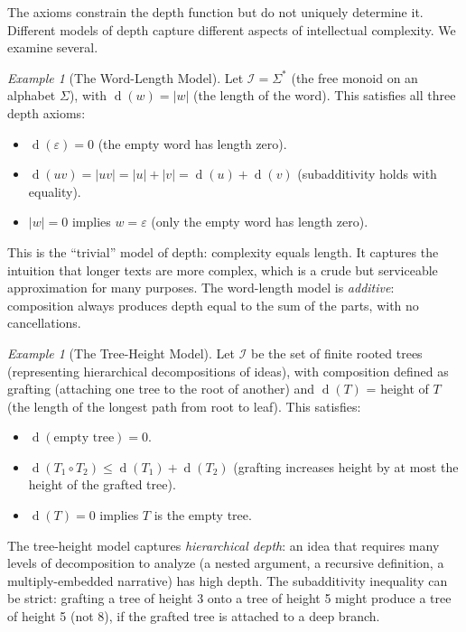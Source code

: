 \documentclass[11pt,openany]{book}
\theoremstyle{definition}
\theoremstyle{plain}
\theoremstyle{remark}
\newtheorem{example}[axiom]{Example}
\newcommand{\IS}{\mathcal{I}}               %
\newcommand{\depth}{\operatorname{d}}       %
\begin{document}
The axioms constrain the depth function but do not uniquely determine it. Different models of depth capture different aspects of intellectual complexity. We examine several.

\begin{example}[The Word-Length Model]
Let $\IS = \Sigma^*$ (the free monoid on an alphabet $\Sigma$), with $\depth(w) = |w|$ (the length of the word). This satisfies all three depth axioms:
\begin{itemize}
\item $\depth(\varepsilon) = 0$ (the empty word has length zero).
\item $\depth(uv) = |uv| = |u| + |v| = \depth(u) + \depth(v)$ (subadditivity holds with equality).
\item $|w| = 0$ implies $w = \varepsilon$ (only the empty word has length zero).
\end{itemize}
This is the ``trivial'' model of depth: complexity equals length. It captures the intuition that longer texts are more complex, which is a crude but serviceable approximation for many purposes. The word-length model is \emph{additive}: composition always produces depth equal to the sum of the parts, with no cancellations.
\end{example}

\begin{example}[The Tree-Height Model]
Let $\IS$ be the set of finite rooted trees (representing hierarchical decompositions of ideas), with composition defined as grafting (attaching one tree to the root of another) and $\depth(T)$ = height of $T$ (the length of the longest path from root to leaf). This satisfies:
\begin{itemize}
\item $\depth(\text{empty tree}) = 0$.
\item $\depth(T_1 \circ T_2) \leq \depth(T_1) + \depth(T_2)$ (grafting increases height by at most the height of the grafted tree).
\item $\depth(T) = 0$ implies $T$ is the empty tree.
\end{itemize}
The tree-height model captures \emph{hierarchical depth}: an idea that requires many levels of decomposition to analyze (a nested argument, a recursive definition, a multiply-embedded narrative) has high depth. The subadditivity inequality can be strict: grafting a tree of height 3 onto a tree of height 5 might produce a tree of height 5 (not 8), if the grafted tree is attached to a deep branch.
\end{example}
\end{document}
